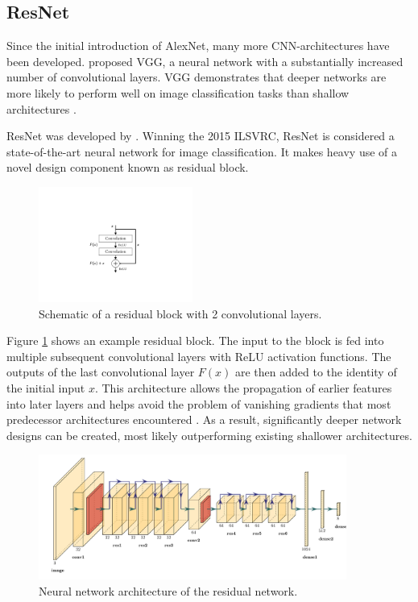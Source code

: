 \documentclass{l4proj}
\begin{document}
\subsection{ResNet}
\label{resnet}

Since the initial introduction of AlexNet, many more CNN-architectures have been developed. \citet{simonyan_very_2015} proposed VGG, a neural network with a substantially increased number of convolutional layers. VGG demonstrates that deeper networks are more likely to perform well on image classification tasks than shallow architectures \citep{alom_history_2018}.

ResNet was developed by \citet{he_deep_2016}. Winning the 2015 ILSVRC, ResNet is considered a state-of-the-art neural network for image classification. It makes heavy use of a novel design component known as residual block. 

\begin{figure}[ht]
  \centering
  \includegraphics[width=0.45\textwidth, trim={7cm 4.8cm 7cm 6cm}, clip]{images/models/res_block}
  \caption{Schematic of a residual block with 2 convolutional layers.}
  \label{fig:res_block}
\end{figure}

Figure \ref{fig:res_block} shows an example residual block. The input to the block is fed into multiple subsequent convolutional layers with ReLU activation functions. The outputs of the last convolutional layer $F(x)$ are then added to the identity of the initial input $x$. This architecture allows the propagation of earlier features into later layers and helps avoid the problem of vanishing gradients that most predecessor architectures encountered \citep{alom_history_2018}. As a result, significantly deeper network designs can be created, most likely outperforming existing shallower architectures.

\begin{figure}[ht]
  \centering
  \includegraphics[width=0.9\textwidth]{images/models/resnet}
  \caption{Neural network architecture of the residual network.}
  \label{fig:resnet}
\end{figure}
\end{document}
